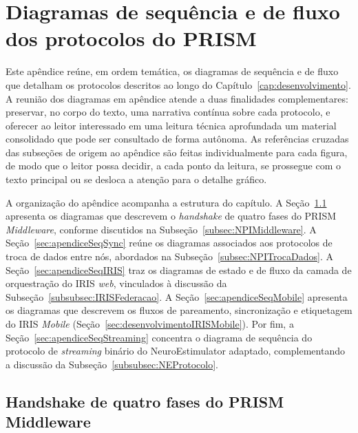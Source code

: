 \chapter{Diagramas de sequência e de fluxo dos protocolos do PRISM}\label{cap:apendiceDiagramasSequencia}

Este apêndice reúne, em ordem temática, os diagramas de sequência e de fluxo que detalham os protocolos descritos ao longo do Capítulo~\ref{cap:desenvolvimento}. A reunião dos diagramas em apêndice atende a duas finalidades complementares: preservar, no corpo do texto, uma narrativa contínua sobre cada protocolo, e oferecer ao leitor interessado em uma leitura técnica aprofundada um material consolidado que pode ser consultado de forma autônoma. As referências cruzadas das subseções de origem ao apêndice são feitas individualmente para cada figura, de modo que o leitor possa decidir, a cada ponto da leitura, se prossegue com o texto principal ou se desloca a atenção para o detalhe gráfico.

A organização do apêndice acompanha a estrutura do capítulo. A Seção~\ref{sec:apendiceSeqMiddleware} apresenta os diagramas que descrevem o \textit{handshake} de quatro fases do PRISM \textit{Middleware}, conforme discutidos na Subseção~\ref{subsec:NPIMiddleware}. A Seção~\ref{sec:apendiceSeqSync} reúne os diagramas associados aos protocolos de troca de dados entre nós, abordados na Subseção~\ref{subsec:NPITrocaDados}. A Seção~\ref{sec:apendiceSeqIRIS} traz os diagramas de estado e de fluxo da camada de orquestração do IRIS \emph{web}, vinculados à discussão da Subseção~\ref{subsubsec:IRISFederacao}. A Seção~\ref{sec:apendiceSeqMobile} apresenta os diagramas que descrevem os fluxos de pareamento, sincronização e etiquetagem do IRIS \textit{Mobile} (Seção~\ref{sec:desenvolvimentoIRISMobile}). Por fim, a Seção~\ref{sec:apendiceSeqStreaming} concentra o diagrama de sequência do protocolo de \textit{streaming} binário do NeuroEstimulator adaptado, complementando a discussão da Subseção~\ref{subsubsec:NEProtocolo}.

\section{Handshake de quatro fases do PRISM Middleware}\label{sec:apendiceSeqMiddleware}

